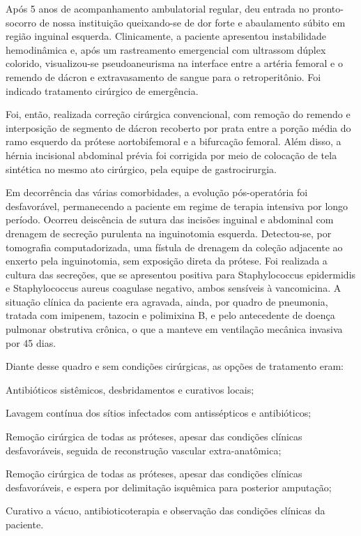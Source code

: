 \documentclass[numberinsection,times,10pt,spreadimages]{memoir}
\begin{document}
Após 5 anos de acompanhamento ambulatorial regular, deu entrada no
pronto-socorro de
nossa instituição queixando-se de dor forte e abaulamento súbito em região
inguinal
esquerda. Clinicamente, a paciente apresentou instabilidade hemodinâmica e, após
um
rastreamento emergencial com ultrassom dúplex colorido, visualizou-se
pseudoaneurisma na interface entre a artéria femoral e o remendo de dácron e
extravasamento de sangue para o retroperitônio. Foi indicado tratamento
cirúrgico de
emergência.

Foi, então, realizada correção cirúrgica convencional, com remoção do remendo e
interposição de segmento de dácron recoberto por prata entre a porção média do
ramo
esquerdo da prótese aortobifemoral e a bifurcação femoral. Além disso, a hérnia
incisional abdominal prévia foi corrigida por meio de colocação de tela
sintética no
mesmo ato cirúrgico, pela equipe de gastrocirurgia.

Em decorrência das várias comorbidades, a evolução pós-operatória foi
desfavorável,
permanecendo a paciente em regime de terapia intensiva por longo período.
Ocorreu
deiscência de sutura das incisões inguinal e abdominal com drenagem de secreção
purulenta na inguinotomia esquerda. Detectou-se, por tomografia computadorizada,
uma
fístula de drenagem da coleção adjacente ao enxerto pela inguinotomia, sem
exposição
direta da prótese. Foi realizada a cultura das secreções, que se apresentou
positiva
para Staphylococcus epidermidis e Staphylococcus
aureus coagulase negativo, ambos sensíveis à vancomicina. A situação
clínica da paciente era agravada, ainda, por quadro de pneumonia, tratada com
imipenem, tazocin e polimixina B, e pelo antecedente de doença pulmonar
obstrutiva
crônica, o que a manteve em ventilação mecânica invasiva por 45 dias.

Diante desse quadro e sem condições cirúrgicas, as opções de tratamento eram:

Antibióticos sistêmicos, desbridamentos e curativos locais;

Lavagem contínua dos sítios infectados com antissépticos e antibióticos;

Remoção cirúrgica de todas as próteses, apesar das condições clínicas
desfavoráveis, seguida de reconstrução vascular extra-anatômica;

Remoção cirúrgica de todas as próteses, apesar das condições clínicas
desfavoráveis, e espera por delimitação isquêmica para posterior
amputação;

Curativo a vácuo, antibioticoterapia e observação das condições clínicas da
paciente.
\end{document}
